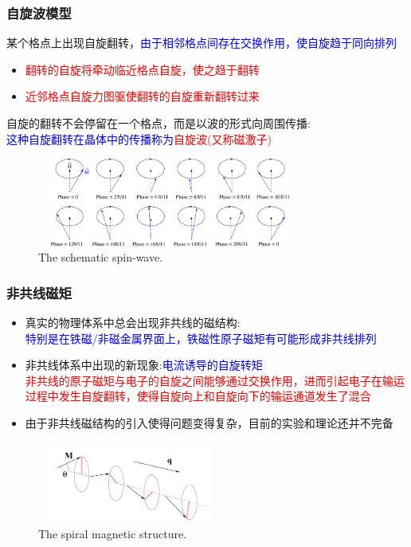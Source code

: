 \frame
{
	\frametitle{自旋波模型}
	某个格点上出现自旋翻转，\textcolor{blue}{由于相邻格点间存在交换作用，使自旋趋于同向排列}
	\begin{itemize}
		\item \textcolor{red}{翻转的自旋将牵动临近格点自旋，使之趋于翻转}
		\item \textcolor{red}{近邻格点自旋力图驱使翻转的自旋重新翻转过来}
	\end{itemize}
	自旋的翻转不会停留在一个格点，而是以波的形式向周围传播:\\
	\textcolor{blue}{这种自旋翻转在晶体中的传播称为}\textcolor{red}{自旋波(又称磁激子)}
\begin{figure}[h!]
\centering
\includegraphics[height=1.15in,width=3.45in,viewport=0 0 830 300,clip]{Figures/Mag_spinwave-2.png}
\caption{\tiny \textrm{The schematic spin-wave.}}%
\label{Mag_spinwave-2}
\end{figure}
}

\frame
{
	\frametitle{非共线磁矩}
	\begin{itemize}
		\item 真实的物理体系中总会出现非共线的磁结构:\\\textcolor{blue}{特别是在铁磁/非磁金属界面上，铁磁性原子磁矩有可能形成非共线排列}
		\item 非共线体系中出现的新现象:\textcolor{blue}{电流诱导的自旋转矩}\\
			\textcolor{red}{非共线的原子磁矩与电子的自旋之间能够通过交换作用，进而引起电子在输运过程中发生自旋翻转，使得自旋向上和自旋向下的输运通道发生了混合}%
		\item 由于非共线磁结构的引入使得问题变得复杂，目前的实验和理论还并不完备
	\end{itemize}
\begin{figure}[h!]
\centering
\vspace*{-0.10in}
\includegraphics[height=1.05in,width=2.40in,viewport=10 10 840 370,clip]{Figures/Magnet_spinal_wave.png}
\caption{\tiny \textrm{The spiral magnetic structure.}}%
\label{Mag_spinal-wave}
\end{figure}
}

